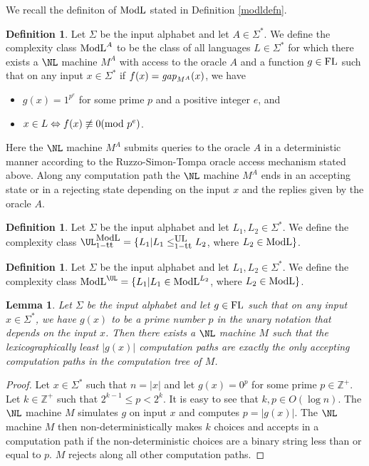 \documentclass{amsbook}
\newtheorem{lemma}[theorem]{Lemma}
\theoremstyle{definition}
\newtheorem{definition}[theorem]{Definition}
\theoremstyle{remark}
\numberwithin{section}{chapter}
\numberwithin{equation}{chapter}
\newcommand{\ULredn}{\mbox{\small{\rm UL}}}
\newcommand{\ModL}{\mbox{\rm ModL}}
\newcommand{\FL}{\mbox{\rm FL}}
\renewcommand{\mod}{\mbox{\textrm mod~}}
\newcommand{\Z}{\mathbb{Z}}
\newcommand{\gap}{\mbox{\it gap}}
\newcommand{\trt}{\mbox{\small{\rm tt}}}
\begin{document}
We recall the definiton of $\ModL$ stated in Definition \ref{modldefn}.
\begin{definition}
Let $\Sigma$ be the input alphabet and let $A\in\Sigma^*$. We define the complexity class $\ModL^A$ to be the class of all languages $L\in\Sigma^*$ for which there exists a $\NL$ machine $M^A$ with access to the oracle $A$ and a function $g\in\FL$ such that on any input $x\in\Sigma^*$ if $f(x)=\gap_{M^A}(x)$, we have
\begin{itemize}
\item $g(x)=1^{p^e}$ for some prime $p$ and a positive integer $e$, and
\item $x\in L\Leftrightarrow f(x)\not \equiv 0(\mod p^e)$.
\end{itemize}
Here the $\NL$ machine $M^A$ submits queries to the oracle $A$ in a deterministic manner according to the Ruzzo-Simon-Tompa oracle access mechanism stated above. Along any computation path the $\NL$ machine $M^A$ ends in an accepting state or in a rejecting state depending on the input $x$ and the replies given by the oracle $A$.
\end{definition}
\begin{definition}
Let $\Sigma$ be the input alphabet and let $L_1,L_2\in \Sigma ^*$. We define the complexity class $\UL^{\small \ModL}_{1-\trt}=\{L_1|L_1\leq ^{\ULredn}_{1-\trt}L_2$, where $L_2\in\ModL\}$.
\end{definition}
\begin{definition}\label{modluldefn}
Let $\Sigma$ be the input alphabet and let $L_1,L_2\in \Sigma ^*$. We define the complexity class $\ModL^{\small \UL}=\{L_1|L_1\in \ModL^{L_2}$, where $L_2\in\ModL\}$.
\end{definition}

\begin{lemma}\label{fillacceptpaths}
Let $\Sigma$ be the input alphabet and let $g\in \FL$ such that on any input $x\in \Sigma ^*$, we have $g(x)$ to be a prime number $p$ in the unary notation that depends on the input $x$. Then there exists a $\NL$ machine $M$ such that the lexicographically least $|g(x)|$ computation paths are exactly the only accepting computation paths in the computation tree of $M$.
\end{lemma}
\begin{proof}
Let $x\in\Sigma^*$ such that $n=|x|$ and let $g(x)=0^p$ for some prime $p\in\Z^+$. Let $k\in\Z^+$ such that $2^{k-1}\leq p<2^k$. It is easy to see that $k,p\in O(\log n)$. The $\NL$ machine $M$ simulates $g$ on input $x$ and computes $p=|g(x)|$. The $\NL$ machine $M$ then non-deterministically makes $k$ choices and accepts in a computation path if the non-deterministic choices are a binary string less than or equal to $p$. $M$ rejects along all other computation paths.
\end{proof}
\end{document}
